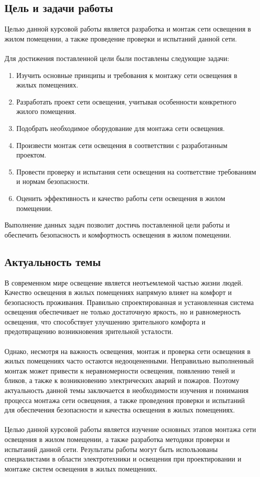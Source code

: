 \documentclass{article}
\begin{document}
\subsection{Цель и задачи работы}
Целью данной курсовой работы является разработка и монтаж сети освещения в жилом помещении, а также проведение проверки и испытаний данной сети.\\
~\\
Для достижения поставленной цели были поставлены следующие задачи:
\begin{enumerate}
\item Изучить основные принципы и требования к монтажу сети освещения в жилых помещениях.
\item Разработать проект сети освещения, учитывая особенности конкретного жилого помещения.
\item Подобрать необходимое оборудование для монтажа сети освещения.
\item Произвести монтаж сети освещения в соответствии с разработанным проектом.
\item Провести проверку и испытания сети освещения на соответствие требованиям и нормам безопасности.
\item Оценить эффективность и качество работы сети освещения в жилом помещении.
\end{enumerate}
Выполнение данных задач позволит достичь поставленной цели работы и обеспечить безопасность и комфортность освещения в жилом помещении.
\subsection{Актуальность темы}
В современном мире освещение является неотъемлемой частью жизни людей. Качество освещения в жилых помещениях напрямую влияет на комфорт и безопасность проживания. Правильно спроектированная и установленная система освещения обеспечивает не только достаточную яркость, но и равномерность освещения, что способствует улучшению зрительного комфорта и предотвращению возникновения зрительной усталости.\\
~\\
Однако, несмотря на важность освещения, монтаж и проверка сети освещения в жилых помещениях часто остаются недооцененными. Неправильно выполненный монтаж может привести к неравномерности освещения, появлению теней и бликов, а также к возникновению электрических аварий и пожаров. Поэтому актуальность данной темы заключается в необходимости изучения и понимания процесса монтажа сети освещения, а также проведения проверки и испытаний для обеспечения безопасности и качества освещения в жилых помещениях.\\
~\\
Целью данной курсовой работы является изучение основных этапов монтажа сети освещения в жилом помещении, а также разработка методики проверки и испытаний данной сети. Результаты работы могут быть использованы специалистами в области электротехники и освещения при проектировании и монтаже систем освещения в жилых помещениях.\\
~\\
\end{document}
